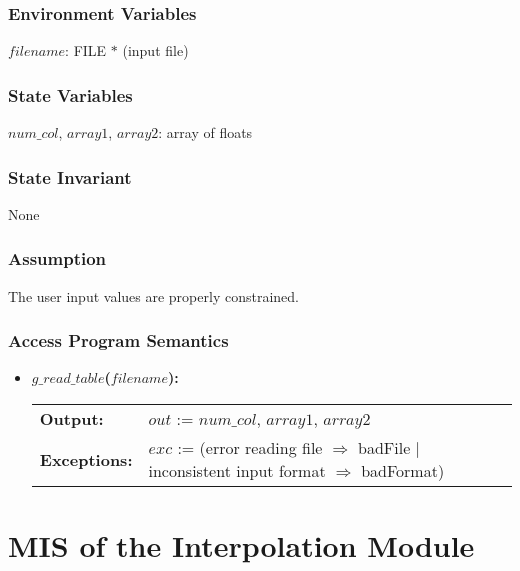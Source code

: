 \documentclass[12pt]{article}
\begin{document}
\subsubsection{Environment Variables}

$filename$: FILE $\ast$ (input file)

\subsubsection{State Variables}

$num\_col$, $array1$, $array2$: array of floats\\

\subsubsection{State Invariant}

None

\subsubsection{Assumption}

The user input values are properly constrained.

\subsubsection{Access Program Semantics}

\begin{itemize}
\item\textbf{$g\_read\_table$($filename$):} \\ \newline
\begin{tabular}{l p{}}
\textbf{Output:} & $out$ := $num\_col$, $array1$, $array2$ \\
\textbf{Exceptions:} & $exc$ := \newline
(error reading file $\Rightarrow$ badFile \newline $|$ inconsistent input format $\Rightarrow$ badFormat)\\
\end{tabular}
\end{itemize}


\section{MIS of the Interpolation Module} \label{SecInterp}
\end{document}

